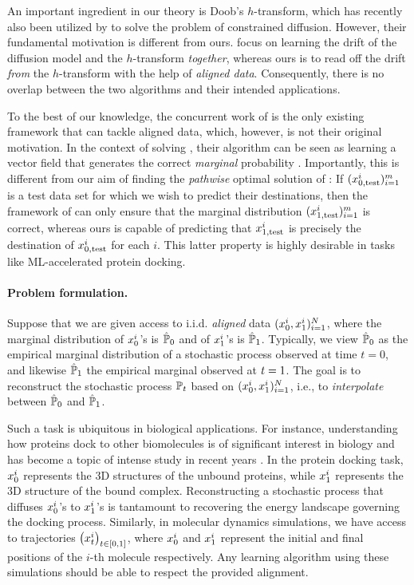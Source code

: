 An important ingredient in our theory is Doob's $h$-transform, which has recently also been utilized by \cite{liu2023learning} to solve the problem of constrained diffusion. However, their fundamental motivation is different from ours. \cite{liu2023learning} focus on learning the drift of the diffusion model and the $h$-transform \emph{together}, whereas ours is to read off the drift \emph{from} the $h$-transform with the help of {\em aligned data}. Consequently, there is no overlap between the two algorithms and their intended applications. 

To the best of our knowledge, the concurrent work of \citet{tong2023conditional} is the only existing framework that can tackle aligned data, which, however, is not their original motivation. In the context of solving , their algorithm can be seen as learning a vector field that generates the correct \emph{marginal} probability \citep[cf.][Proposition 4.3]{tong2023conditional}. Importantly, this is different from our aim of finding the \emph{pathwise} optimal solution of : If $(x^i_{0,\textup{test}})_{i=1}^m$ is a test data set for which we wish to predict their destinations, then the framework of \citet{tong2023conditional} can only ensure that the marginal distribution $(x^i_{1,\textup{test}})_{i=1}^m$ is correct, whereas ours is capable of predicting that $x^i_{1,\textup{test}}$ is precisely the destination of $x^i_{0,\textup{test}}$ for each $i$. This latter property is highly desirable in tasks like ML-accelerated protein docking.

\paragraph{Problem formulation.}

Suppose that we are given access to i.i.d. \emph{aligned} data $(x_0^i,x_1^i)_{i=1}^N$, where the marginal distribution of $x^i_0$'s is $\hat{\mathbb{P}}_{ {0} }$ and of $x_1^i$'s is $\hat{\mathbb{P}}_{ {1}}$. Typically, we view $\hat{\mathbb{P}}_{ {0} }$ as the empirical marginal distribution of a stochastic process observed at time $t= 0$, and likewise $\hat{\mathbb{P}}_{ {1}}$ the empirical marginal observed at $t=1$. The goal is to reconstruct the stochastic process $\mathbb{P}_{{t}}$ based on $(x_0^i,x_1^i)_{i=1}^N$, i.e., to \emph{interpolate} between $\hat{\mathbb{P}}_{ {0} }$ and $\hat{\mathbb{P}}_{ {1}}$.

Such a task is ubiquitous in biological applications. For instance, understanding how proteins dock to other biomolecules is of significant interest in biology and has become a topic of intense study in recent years \citep{ganea2022independent, tsaban2022harnessing, corso2022diffdock}. In the protein docking task, $x_0^i$ represents the 3D structures of the unbound proteins, while $x_1^i$ represents the 3D structure of the bound complex. Reconstructing a stochastic process that diffuses $x_0^i$'s to $x_1^i$'s is tantamount to recovering the energy landscape governing the docking process.  Similarly, in molecular dynamics simulations, we have access to trajectories $\left(x_t^i\right)_{t \in [0, 1]}$, where $x_0^i$ and $x_1^i$ represent the initial and final positions of the $i$-th molecule respectively. Any learning algorithm using these simulations should be able to respect the provided alignment. 


